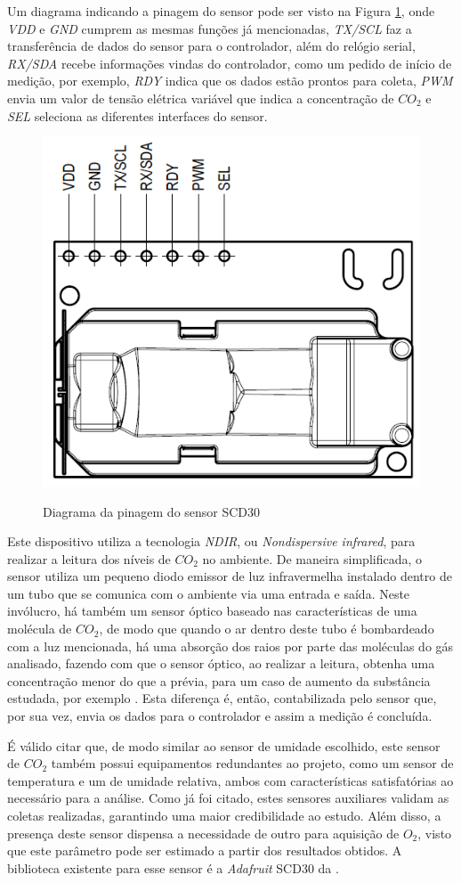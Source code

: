 \documentclass[acronym,symbols,table]{fei}
\begin{document}
Um diagrama indicando a pinagem do sensor pode ser visto na Figura \ref{fig:PinCO2}, onde \textit{VDD} e \textit{GND} cumprem as mesmas funções já mencionadas, \textit{TX/SCL} faz a transferência de dados do sensor para o controlador, além do relógio serial, \textit{RX/SDA} recebe informações vindas do controlador, como um pedido de início de medição, por exemplo, \textit{RDY} indica que os dados estão prontos para coleta, \textit{PWM} envia um valor de tensão elétrica variável que indica a concentração de ${CO}_{2}$ e \textit{SEL} seleciona as diferentes interfaces do sensor.

\begin{figure}[!htb]
\centering
    \caption{Diagrama da pinagem do sensor SCD30}
    \includegraphics[width=0.5\linewidth]{Imagens/PinCO2.png}
    \label{fig:PinCO2}
\end{figure}

Este dispositivo utiliza a tecnologia \textit{NDIR}, ou \textit{Nondispersive infrared}, para realizar a leitura dos níveis de ${CO}_{2}$ no ambiente. De maneira simplificada, o sensor utiliza um pequeno diodo emissor de luz infravermelha instalado dentro de um tubo que se comunica com o ambiente via uma entrada e saída.  Neste invólucro, há também um sensor óptico baseado nas características de uma molécula de ${CO}_{2}$,  de modo que quando o ar dentro deste tubo é bombardeado com a luz mencionada, há uma absorção dos raios por parte das moléculas do gás analisado, fazendo com que o sensor óptico, ao realizar a leitura, obtenha uma concentração menor do que a prévia, para um caso de aumento da substância estudada, por exemplo \cite{NDIR}. Esta diferença é, então, contabilizada pelo sensor que, por sua vez, envia os dados para o controlador e assim a medição é concluída.

É válido citar que, de modo similar ao sensor de umidade escolhido, este sensor de ${CO}_{2}$ também possui equipamentos redundantes ao projeto, como um sensor de temperatura e um de umidade relativa, ambos com características satisfatórias ao necessário para a análise. Como já foi citado, estes sensores auxiliares validam as coletas realizadas, garantindo uma maior credibilidade ao estudo. Além disso, a presença deste sensor dispensa a necessidade de outro para aquisição de ${O}_{2}$, visto que este parâmetro pode ser estimado a partir dos resultados obtidos. A biblioteca existente para esse sensor é a \textit{Adafruit} SCD30 da \textcite{Adafruit_SCD30}. 
\end{document}
